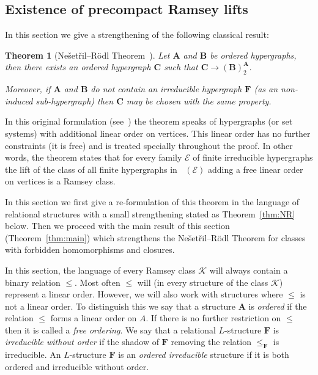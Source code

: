 \documentclass{elsarticle}
\def\Forbm{\mathop{\mathrm{Forb_m}}\nolimits}
\def\str#1{\mathbf {#1}}
\def\K{{\mathcal K}}
\theoremstyle{plain}
\newtheorem{theorem}{Theorem}[section]
\theoremstyle{definition}
\theoremstyle{remark}
\begin{document}
\subsection{Existence of precompact Ramsey lifts}
\label{sec:NR}
In this section we give a strengthening of the following classical result:
\begin{theorem}[Ne\v set\v ril--R\"odl Theorem~\cite{Nevsetvril1977}]
\label{thm:NRoriginal}
Let $\str{A}$ and $\str{B}$ be ordered hypergraphs, then there exists an ordered hypergraph
$\str{C}$ such that $\str{C}\longrightarrow (\str{B})^\str{A}_2$.

Moreover, if $\str{A}$ and $\str{B}$ do not contain an irreducible hypergraph
$\str{F}$ (as an non-induced sub-hypergraph) then $\str{C}$ may be chosen
with the same property.
\end{theorem}
In this original formulation (see~\cite{Nevsetvril1989}) the theorem speaks of hypergraphs (or set systems)
with additional linear order on vertices. This linear order has no further constraints (it is free) and is treated specially throughout the
proof. In other words, the theorem states that for every family $\mathcal {E}$ of finite irreducible hypergraphs the lift of the class of all
finite hypergraphs in $\Forbm(\mathcal E)$ adding a free linear order on vertices is a Ramsey class.

In this section we first
give a re-formulation of this theorem in the language of
relational structures with a small strengthening stated as Theorem~\ref{thm:NR} below.  Then we proceed with the main result of this section (Theorem~\ref{thm:main}) which strengthens
the Ne\v set\v ril--R\"odl Theorem for classes with forbidden homomorphisms and closures.

In this section, the language of every Ramsey class $\K$ will always contain a binary relation
$\leq$. Most often $\leq$ will (in every structure of the class $\K$) represent a linear
order. However, we will also work with structures where $\leq$ is not a linear
order. To distinguish this we say that a structure $\str{A}$ is \emph{ordered} if the relation
$\leq$ forms a linear order on $A$.  If there is no further restriction on $\leq$ then it
is called a \emph{free ordering}.
We say that a relational $L$-structure $\str{F}$ is \emph{irreducible without order} if the shadow of $\str{F}$ removing the relation $\leq_\str{F}$ is irreducible. 
An $L$-structure $\str{F}$ is an \emph{ordered irreducible} structure if it is both ordered and
irreducible without order.
\end{document}
